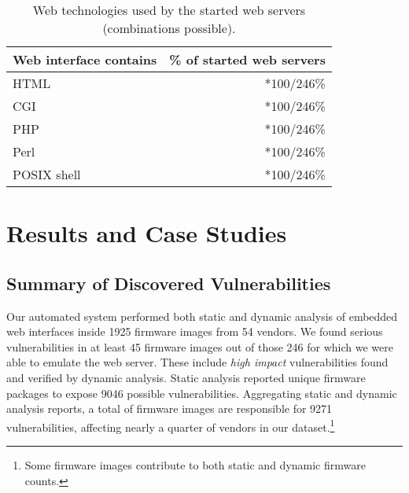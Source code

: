 \documentclass[conference]{./templates/ndss/IEEEtran}
\newcounter{t0d0_counter}
\newcounter{pr00f_counter}
\newcommand\printpercent[2]{\the\numexpr#1*100/#2\%}
\newcommand{\countfirmwarewebTP}{1925}
\newcommand{\CountFirmwareWebTPVendors}{54}
\newcommand{\CountFirmwareEmulatedWebServerStarted}{246}
\newcommand{\CountFirmwareDynVulnTotalHigh}{45} \newcommand{\CountFirmwareDynVulnTotalLow}{23} \newcommand{\CountFirmwareDynVulnCmdInj}{21}
\newcommand{\countfirmwarephpripstotal}{9046}
\newcommand{\CountVulnsConclusion}{9271}
\newcommand{\CountFirmwareWebTechHtml}{242}
\newcommand{\CountFirmwareWebTechCgi}{140}
\newcommand{\CountFirmwareWebTechPhp}{5}
\newcommand{\CountFirmwareWebTechPerl}{8}
\newcommand{\CountFirmwareWebTechShell}{26}
\begin{document}
\begin{table}[t]
\centering
\caption{Web technologies used by the started web servers (combinations possible).}
\begin{tabular}{lr}\\
\toprule

\textbf{Web interface contains} & \textbf{\% of started web servers} \\\midrule

HTML        &   \printpercent{\CountFirmwareWebTechHtml}{\CountFirmwareEmulatedWebServerStarted}    \\
CGI         &   \printpercent{\CountFirmwareWebTechCgi}{\CountFirmwareEmulatedWebServerStarted}    \\
PHP         &   \printpercent{\CountFirmwareWebTechPhp}{\CountFirmwareEmulatedWebServerStarted}    \\
Perl        &   \printpercent{\CountFirmwareWebTechPerl}{\CountFirmwareEmulatedWebServerStarted}    \\
POSIX shell &   \printpercent{\CountFirmwareWebTechShell}{\CountFirmwareEmulatedWebServerStarted}    \\

\bottomrule

\end{tabular}
\label{tbl:dataset-web-tech}
\end{table}





\section{Results and Case Studies}
\label{sec:case-studies}


\subsection{Summary of Discovered Vulnerabilities}
\label{sec:results-overview}

Our automated system performed
both static and dynamic analysis of embedded web interfaces inside 
\countfirmwarewebTP{} firmware images from \CountFirmwareWebTPVendors{} vendors.
We found serious vulnerabilities in at least 
\CountFirmwareDynVulnTotalHigh{} firmware images out of 
those \CountFirmwareEmulatedWebServerStarted{} for which we were able to 
emulate the web server. 
These include \CountDynVulnsTotalHigh{} \emph{high impact} vulnerabilities 
found and verified by dynamic analysis. 
Static analysis reported \countfirmwarephpfwripsvuln{} unique firmware 
packages to expose \countfirmwarephpripstotal{} possible vulnerabilities. 
Aggregating static and dynamic analysis reports, a total of 
\countfirmwarestotal{} firmware 
images are responsible for \CountVulnsConclusion{}
vulnerabilities, affecting nearly a quarter of vendors in our 
dataset.\footnote{Some firmware images contribute to both static and dynamic firmware counts.}
\end{document}
